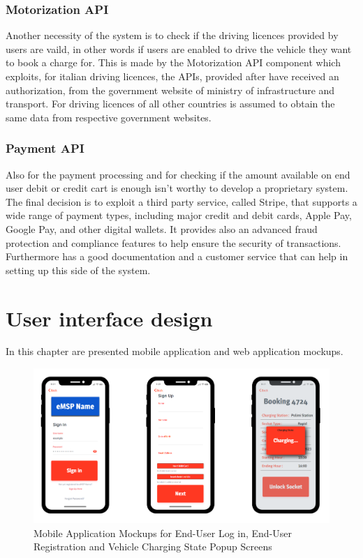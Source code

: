 \documentclass[a4paper]{report}
\begin{document}
\subsection{Motorization API}
Another necessity of the system is to check if the driving licences provided by users are vaild, in other words if users are enabled to drive the vehicle they want to book a charge for. This is made by the Motorization API component which exploits, for italian driving licences, the APIs, provided after have received an authorization, from the government website of ministry of infrastructure and transport. For driving licences of all other countries is assumed to obtain the same data from respective government websites.

\subsection{Payment API}
Also for the payment processing and for checking if the amount available on end user debit or credit cart is enough isn't worthy to develop a proprietary system. The final decision is to exploit a third party service, called Stripe, that supports a wide range of payment types, including major credit and debit cards, Apple Pay, Google Pay, and other digital wallets. It provides also an advanced fraud protection and compliance features to help ensure the security of transactions. Furthermore has a good documentation and a customer service that can help in setting up this side of the system.

\chapter{User interface design}
In this chapter are presented mobile application and web application mockups.

\begin{figure}[hp]
\centering
\includegraphics[scale=0.45]{img/mockups/MCKP1.png}
\caption{Mobile Application Mockups for End-User Log in, End-User Registration and Vehicle Charging State Popup Screens}
\label{fig:MobileApp-activity}
\end{figure}
\end{document}
